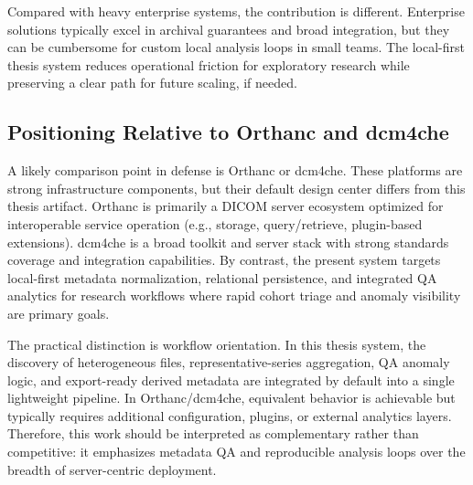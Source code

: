 Compared with heavy enterprise systems, the contribution is different. Enterprise solutions typically excel in archival guarantees and broad integration, but they can be cumbersome for custom local analysis loops in small teams. The local-first thesis system reduces operational friction for exploratory research while preserving a clear path for future scaling, if needed.

\subsection{Positioning Relative to Orthanc and dcm4che}
A likely comparison point in defense is Orthanc or dcm4che. These platforms are strong infrastructure components, but their default design center differs from this thesis artifact. Orthanc is primarily a DICOM server ecosystem optimized for interoperable service operation (e.g., storage, query/retrieve, plugin-based extensions). dcm4che is a broad toolkit and server stack with strong standards coverage and integration capabilities. By contrast, the present system targets local-first metadata normalization, relational persistence, and integrated QA analytics for research workflows where rapid cohort triage and anomaly visibility are primary goals.

The practical distinction is workflow orientation. In this thesis system, the discovery of heterogeneous files, representative-series aggregation, QA anomaly logic, and export-ready derived metadata are integrated by default into a single lightweight pipeline. In Orthanc/dcm4che, equivalent behavior is achievable but typically requires additional configuration, plugins, or external analytics layers. Therefore, this work should be interpreted as complementary rather than competitive: it emphasizes metadata QA and reproducible analysis loops over the breadth of server-centric deployment.
